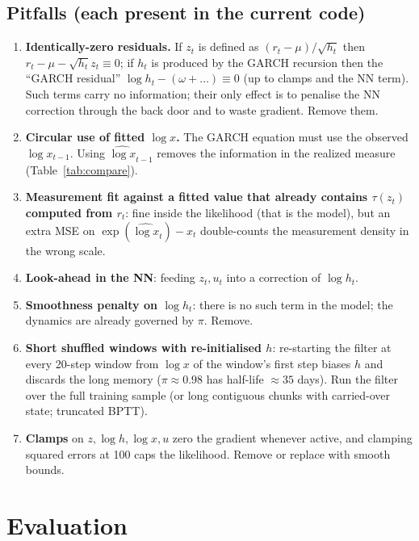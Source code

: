 \documentclass[11pt]{article}
\begin{document}
\subsection{Pitfalls (each present in the current code)}
\begin{enumerate}
\item \textbf{Identically-zero residuals.} If $z_t$ is defined as $(r_t-\mu)/\sqrt{h_t}$ then
  $r_t-\mu-\sqrt{h_t}z_t\equiv0$; if $h_t$ is produced by the GARCH recursion then the
  ``GARCH residual'' $\log h_t-(\omega+\dots)\equiv0$ (up to clamps and the NN term). Such
  terms carry no information; their only effect is to penalise the NN correction through
  the back door and to waste gradient. Remove them.
\item \textbf{Circular use of fitted $\log x$.} The GARCH equation must use the observed
  $\log x_{t-1}$. Using $\widehat{\log x}_{t-1}$ removes the information in the realized
  measure (Table~\ref{tab:compare}).
\item \textbf{Measurement fit against a fitted value that already contains $\tau(z_t)$
  computed from $r_t$}: fine inside the likelihood (that is the model), but an extra MSE on
  $\exp(\widehat{\log x}_t)-x_t$ double-counts the measurement density in the wrong scale.
\item \textbf{Look-ahead in the NN}: feeding $z_t,u_t$ into a correction of $\log h_t$.
\item \textbf{Smoothness penalty on $\log h_t$}: there is no such term in the model; the
  dynamics are already governed by $\pi$. Remove.
\item \textbf{Short shuffled windows with re-initialised $h$}: re-starting the filter at
  every 20-step window from $\log x$ of the window's first step biases $h$ and discards the
  long memory ($\pi\approx0.98$ has half-life $\approx35$ days). Run the filter over the full
  training sample (or long contiguous chunks with carried-over state; truncated BPTT).
\item \textbf{Clamps} on $z,\log h,\log x,u$ zero the gradient whenever active, and clamping
  squared errors at 100 caps the likelihood. Remove or replace with smooth bounds.
\end{enumerate}

\section{Evaluation}\label{sec:eval}
\end{document}
